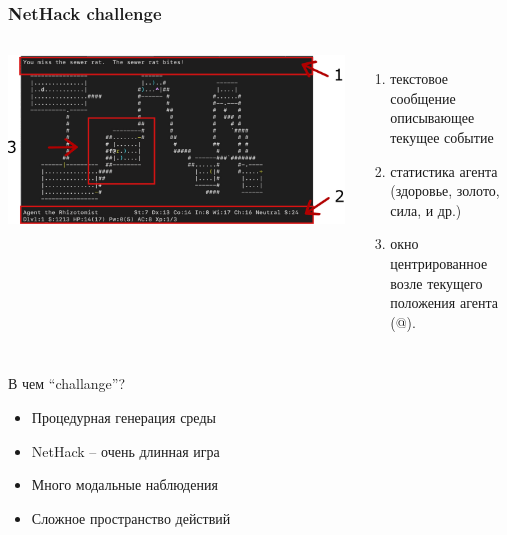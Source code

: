 \begin{frame}
\frametitle{NetHack challenge}
\begin{columns}
  \centering
  \includegraphics[width=1\linewidth]{images/nethack_map_view.pdf}
\begin{enumerate}
    \item текстовое сообщение описывающее текущее событие
    \item статистика агента (здоровье, золото, сила, и др.) 
    \item окно центрированное возле текущего положения агента (@).
\end{enumerate}
\end{columns} 
\vspace{20pt}
В чем ``challange''?
\begin{itemize}
    \item Процедурная генерация среды
    \item NetHack – очень длинная игра
    \item Много модальные наблюдения
    \item Сложное пространство действий
\end{itemize}


\end{frame}



